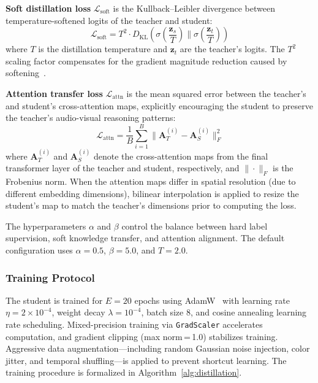 \documentclass[lettersize,journal]{IEEEtran}
\begin{document}
\textbf{Soft distillation loss} $\mathcal{L}_{\text{soft}}$ is the Kullback--Leibler divergence between temperature-softened logits of the teacher and student:
\begin{equation}
\label{eq:soft_loss}
    \mathcal{L}_{\text{soft}} = T^2 \cdot D_{\text{KL}}\!\left(\sigma\!\left(\frac{\mathbf{z}_s}{T}\right) \bigg\| \sigma\!\left(\frac{\mathbf{z}_t}{T}\right)\right)
\end{equation}
where $T$ is the distillation temperature and $\mathbf{z}_t$ are the teacher's logits. The $T^2$ scaling factor compensates for the gradient magnitude reduction caused by softening~\cite{hinton2015distilling}.

\textbf{Attention transfer loss} $\mathcal{L}_{\text{attn}}$ is the mean squared error between the teacher's and student's cross-attention maps, explicitly encouraging the student to preserve the teacher's audio-visual reasoning patterns:
\begin{equation}
\label{eq:attn_loss}
    \mathcal{L}_{\text{attn}} = \frac{1}{B} \sum_{i=1}^{B} \bigl\| \mathbf{A}_T^{(i)} - \mathbf{A}_S^{(i)} \bigr\|_F^2
\end{equation}
where $\mathbf{A}_T^{(i)}$ and $\mathbf{A}_S^{(i)}$ denote the cross-attention maps from the final transformer layer of the teacher and student, respectively, and $\|\cdot\|_F$ is the Frobenius norm. When the attention maps differ in spatial resolution (due to different embedding dimensions), bilinear interpolation is applied to resize the student's map to match the teacher's dimensions prior to computing the loss.

The hyperparameters $\alpha$ and $\beta$ control the balance between hard label supervision, soft knowledge transfer, and attention alignment. The default configuration uses $\alpha = 0.5$, $\beta = 5.0$, and $T = 2.0$.

\subsubsection{Training Protocol}
The student is trained for $E = 20$ epochs using AdamW~\cite{loshchilov2019adamw} with learning rate $\eta = 2 \times 10^{-4}$, weight decay $\lambda = 10^{-4}$, batch size 8, and cosine annealing learning rate scheduling. Mixed-precision training via \texttt{GradScaler} accelerates computation, and gradient clipping (max norm\,=\,1.0) stabilizes training. Aggressive data augmentation---including random Gaussian noise injection, color jitter, and temporal shuffling---is applied to prevent shortcut learning. The training procedure is formalized in Algorithm~\ref{alg:distillation}.
\end{document}
